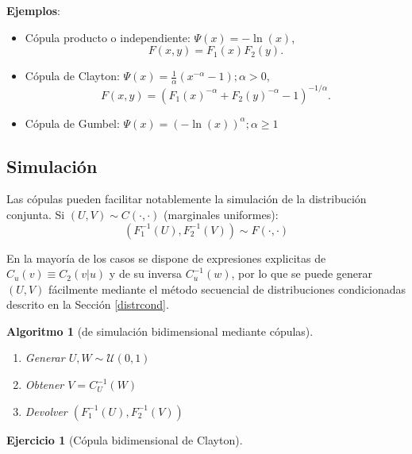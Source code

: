 \documentclass[
]{book}
\theoremstyle{break}
\newtheorem{conjecture}{Algoritmo}[chapter]
\theoremstyle{definition}
\theoremstyle{definition}
\theoremstyle{definition}
\newtheorem{exercise}{Ejercicio}[chapter]
\theoremstyle{definition}
\theoremstyle{remark}
\begin{document}
\textbf{Ejemplos}:

\begin{itemize}
\item
  Cópula producto o independiente:
  \(\Psi(x)=-\ln(x)\),
  \[F(x,y)=F_1(x)F_2(y).\]
\item
  Cópula de Clayton: \(\Psi(x)=\frac{1}{\alpha}\left( x^{-\alpha }-1\right) ;\alpha>0\),
  \[F(x,y)=(F_1(x)^{-\alpha}+F_2(y)^{-\alpha}-1)^{-1/\alpha}.\]
\item
  Cópula de Gumbel:
  \(\Psi(x)=\left( -\ln(x)\right)^{\alpha};\alpha \geq1\)
\end{itemize}

\hypertarget{simulaciuxf3n}{%
\subsection{Simulación}\label{simulaciuxf3n}}

Las cópulas pueden facilitar notablemente la simulación de la distribución conjunta.
Si \((U,V)\sim C(\cdot,\cdot)\) (marginales uniformes):
\[\left( F_1^{-1}(U),F_2^{-1}(V)\right)  \sim F(\cdot,\cdot)\]

En la mayoría de los casos se dispone de expresiones explicitas de \(C_{u}(v)\equiv C_2\left( \left. v\right \vert u\right)\) y de su inversa \(C_{u}^{-1}(w)\), por lo que se puede generar \((U,V)\) fácilmente mediante el método secuencial de distribuciones condicionadas descrito en la Sección \ref{distrcond}.

\begin{conjecture}[de simulación bidimensional mediante cópulas]
\protect\hypertarget{cnj:copula-bidim}{}{\label{cnj:copula-bidim} {} }

\begin{enumerate}
\def\labelenumi{\arabic{enumi}.}
\item
  Generar \(U,W\sim \mathcal{U}(0,1)\)
\item
  Obtener \(V=C_{U}^{-1}(W)\)
\item
  Devolver \(\left( F_1^{-1}(U),F_2^{-1}(V)\right)\)
\end{enumerate}
\end{conjecture}

\begin{exercise}[Cópula bidimensional de Clayton]
\protect\hypertarget{exr:clayton2d}{}{\label{exr:clayton2d} {} }
\end{exercise}
\end{document}
